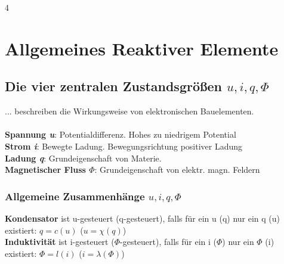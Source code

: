 \documentclass[fs, footer]{latex4ei}
\begin{document}
\begin{multicols*}{4}
    \columnbreak

    \section{Allgemeines Reaktiver Elemente}

    \subsection{Die vier zentralen Zustandsgrößen $u,i,q,\Phi$}
    ... beschreiben die Wirkungsweise von elektronischen Bauelementen.\\ \\
    \textbf{Spannung \textit{u}}: Potentialdifferenz. Hohes zu niedrigem Potential\\
    \textbf{Strom \textit{i}}: Bewegte Ladung. Bewegungsrichtung positiver Ladung\\
    \textbf{Ladung \textit{q}}: Grundeigenschaft von Materie.\\
    \textbf{Magnetischer Fluss \textit{$\Phi$}}: Grundeigenschaft von elektr. magn. Feldern\\
    \subsubsection{Allgemeine Zusammenhänge $u,i,q,\Phi$}
    \textbf{Kondensator} ist u-gesteuert (q-gesteuert), falls für ein u (q) nur ein q (u)  existiert: $q=c(u)$ ($u=\chi(q)$) \\
    \textbf{Induktivität} ist i-gesteuert ($\Phi$-gesteuert), falls für ein i ($\Phi$) nur ein $\Phi$ (i) existiert: $\Phi=l(i)$ ($i=\lambda(\Phi)$) \\



\end{multicols*}
\end{document}
